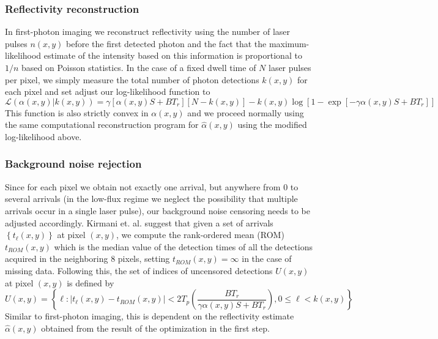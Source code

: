 \subsubsection{Reflectivity reconstruction}
In first-photon imaging we reconstruct reflectivity using the number of laser pulses $n(x,y)$ before the first detected photon and the fact that the maximum-likelihood estimate of the intensity based on this information is proportional to $1/n$ based on Poisson statistics. In the case of a fixed dwell time of $N$ laser pulses per pixel, we simply measure the total number of photon detections $k(x,y)$ for each pixel and set adjust our log-likelihood function to
\begin{equation}
\mathcal{L}\left( \alpha(x,y) | k(x,y) \right) = \gamma \left[ \alpha(x,y) S + B T_r \right] \left[ N - k(x,y) \right] - k(x,y) \log \left[ 1 - \exp \left[ - \gamma \alpha(x,y) S + B T_r \right] \right]
\end{equation}
This function is also strictly convex in $\alpha(x,y)$ and we proceed normally using the same computational reconstruction program for $\hat{\alpha}(x,y)$ using the modified log-likelihood above.

\subsubsection{Background noise rejection}
Since for each pixel we obtain not exactly one arrival, but anywhere from $0$ to several arrivals (in the low-flux regime we neglect the possibility that multiple arrivals occur in a single laser pulse), our background noise censoring needs to be adjusted accordingly. Kirmani et. al. \cite{kirmani-photon} suggest that given a set of arrivals $\left\{ t_\ell(x,y) \right\}$ at pixel $(x,y)$, we compute the rank-ordered mean (ROM) $t_{ROM}(x,y)$ which is the median value of the detection times of all the detections acquired in the neighboring 8 pixels, setting $t_{ROM}(x,y) = \infty$ in the case of missing data. Following this, the set of indices of uncensored detections $U(x,y)$ at pixel $(x,y)$ is defined by
\begin{equation}
U(x,y) = \left\{ \ell : |t_\ell(x,y) - t_{ROM}(x,y)| < 2 T_p \left( \frac{BT_r}{\gamma \alpha(x,y)S + BT_r}  \right), 0 \leq \ell < k(x,y) \right\}
\end{equation}
Similar to first-photon imaging, this is dependent on the reflectivity estimate $\hat{\alpha}(x,y)$ obtained from the result of the optimization in the first step.

